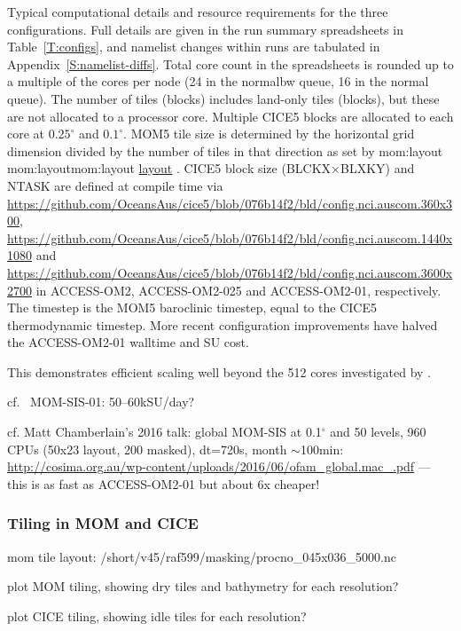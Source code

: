 \documentclass[11pt]{article}
\makeatletter
\newcommand*{\make@hex@label}[1]{%
  \def\hex@label{#1}%
  \@onelevel@sanitize\hex@label
  \EdefEscapeHex\hex@label{\hex@label}%
}
\newcommand*{\hexhyperlink}[2]{%
  \make@hex@label{#1}%
  \hyperlink{\hex@label}{#2}%
}
\newcommand{\momlink}[2]{\hexhyperlink{mom:#2}{#1}}
\newcommand{\paramsty}[1]{\textsf{#1}}
\newcommand{\param}[1]{\paramsty{#1}\index{\paramsty{#1}}}
\newcommand{\mom}[1]{\paramsty{\momlink{#1}{#1}}\index{\paramsty{#1}}}
\makeatother
\begin{document}
\begin{table}[t]
{Typical computational details and resource requirements for the three configurations.
Full details are given in the run summary spreadsheets in Table~\ref{T:configs}, and namelist changes within runs are tabulated in Appendix~\ref{S:namelist-diffs}.
Total core count in the spreadsheets is rounded up to a multiple of the cores per node (24 in the normalbw queue, 16 in the normal queue).
The number of tiles (blocks) includes land-only tiles (blocks), but these are not allocated to a processor core.
Multiple CICE5 blocks are allocated to each core at $0.25^\circ$ and $0.1^\circ$.
MOM5 tile size is determined by the horizontal grid dimension divided by the number of tiles in that direction as set by \mom{layout}.
CICE5 block size (\param{BLCKX}$\times$\param{BLXKY}) and \param{NTASK} are defined at compile time via 
\url{https://github.com/OceansAus/cice5/blob/076b14f2/bld/config.nci.auscom.360x300},
\url{https://github.com/OceansAus/cice5/blob/076b14f2/bld/config.nci.auscom.1440x1080} and 
\url{https://github.com/OceansAus/cice5/blob/076b14f2/bld/config.nci.auscom.3600x2700}
in ACCESS-OM2, ACCESS-OM2-025 and ACCESS-OM2-01, respectively.
The timestep is the MOM5 baroclinic timestep, equal to the CICE5 thermodynamic timestep.
More recent configuration improvements have halved the ACCESS-OM2-01 walltime and SU cost.
}
\label{T:ComputeResources}
\end{table}

This demonstrates efficient scaling well beyond the 512 cores investigated by \citet{Schmidt2007a}.

cf. \ MOM-SIS-01: 50--60kSU/day?

cf. Matt Chamberlain's 2016 talk: global MOM-SIS at 0.1$^\circ$ and 50 levels, 960 CPUs (50x23 layout, 200 masked), dt=720s, month $\sim$100min: \url{http://cosima.org.au/wp-content/uploads/2016/06/ofam_global.mac_.pdf} --- this is as fast as ACCESS-OM2-01 but about 6x cheaper!

\subsubsection{Tiling in MOM and CICE}

mom tile layout: \paramsty{/short/v45/raf599/masking/procno_045x036_5000.nc}

plot MOM tiling, showing dry tiles and bathymetry for each resolution?

plot CICE tiling, showing idle tiles for each resolution?
\end{document}
